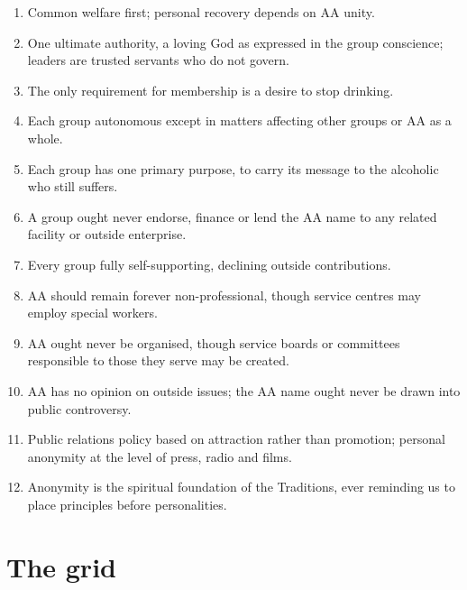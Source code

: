 \documentclass[11pt]{article}
\begin{document}
\begin{enumerate}[leftmargin=*,itemsep=1pt,label=\arabic*.]
\item Common welfare first; personal recovery depends on AA unity.
\item One ultimate authority, a loving God as expressed in the group conscience; leaders are
      trusted servants who do not govern.
\item The only requirement for membership is a desire to stop drinking.
\item Each group autonomous except in matters affecting other groups or AA as a whole.
\item Each group has one primary purpose, to carry its message to the alcoholic who still suffers.
\item A group ought never endorse, finance or lend the AA name to any related facility or outside
      enterprise.
\item Every group fully self-supporting, declining outside contributions.
\item AA should remain forever non-professional, though service centres may employ special workers.
\item AA ought never be organised, though service boards or committees responsible to those they
      serve may be created.
\item AA has no opinion on outside issues; the AA name ought never be drawn into public
      controversy.
\item Public relations policy based on attraction rather than promotion; personal anonymity at the
      level of press, radio and films.
\item Anonymity is the spiritual foundation of the Traditions, ever reminding us to place
      principles before personalities.
\end{enumerate}

\clearpage
\section{The grid}
\end{document}
